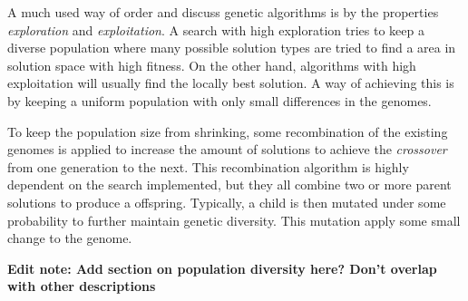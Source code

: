 A much used way of order and discuss genetic algorithms is by the properties \textit{exploration} and \textit{exploitation}. A search with high exploration tries to keep a diverse population where many possible solution types are tried to find a area in solution space with high fitness. On the other hand, algorithms with high exploitation will usually find the locally best solution. A way of achieving this is by keeping a uniform population with only small differences in the genomes.

To keep the population size from shrinking, some recombination of the existing genomes is applied to increase the amount of solutions to achieve the \textit{crossover} from one generation to the next. This recombination algorithm is highly dependent on the search implemented, but they all combine two or more parent solutions to produce a offspring. Typically, a child is then mutated under some probability to further maintain genetic diversity. This mutation apply some small change to the genome.

\textbf{Edit note: Add section on population diversity here? Don't overlap with other descriptions}

